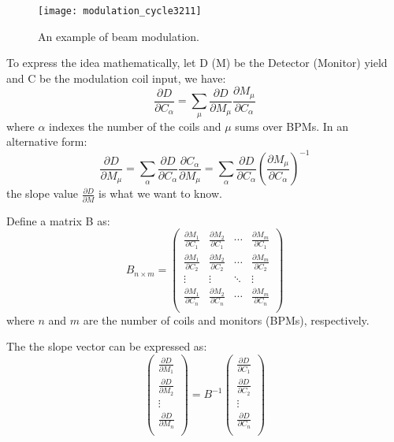 \begin{figure}
    \centering
    \texttt{[image: modulation\_cycle3211]}
    \caption{An example of beam modulation.}
\end{figure}

To express the idea mathematically, let D (M) be the Detector (Monitor) yield and C be
the modulation coil input, we have:
\begin{equation}
    \frac{\partial D}{\partial C_\alpha} = \sum_\mu \frac{\partial D}{\partial M_\mu}\frac{\partial M_\mu}{\partial C_\alpha}
\end{equation}
where $\alpha$ indexes the number of the coils and $\mu$ sums over BPMs. In an alternative form:
\begin{equation}
    \frac{\partial D}{\partial M_\mu} = \sum_\alpha \frac{\partial D}{\partial C_\alpha}\frac{\partial C_\alpha}{\partial M_\mu} = \sum_\alpha \frac{\partial D}{\partial C_\alpha}\left(\frac{\partial M_\mu}{\partial C_\alpha}\right)^{-1}
\end{equation}
the slope value $\frac{\partial D}{\partial M}$ is what we want to know.

Define a matrix B as:
\begin{equation}
    B_{n \times m} = 
    \begin{pmatrix}
	\frac{\partial M_1}{\partial C_1}   & \frac{\partial M_2}{\partial C_1}	& \cdots  & \frac{\partial M_m}{\partial C_1}   \\
	\frac{\partial M_1}{\partial C_2}   & \frac{\partial M_2}{\partial C_2}	& \cdots  & \frac{\partial M_m}{\partial C_2}   \\
	\vdots	& \vdots    & \ddots	& \vdots    \\
	\frac{\partial M_1}{\partial C_n}   & \frac{\partial M_2}{\partial C_n}	& \cdots  & \frac{\partial M_m}{\partial C_n}   \\
    \end{pmatrix}
    \label{eq:B_definition}
\end{equation}
where $n$ and $m$ are the number of coils and monitors (BPMs), respectively.

The the slope vector can be expressed as:
\begin{equation}
    \begin{pmatrix}
	\frac{\partial D}{\partial M_1}	\\
	\frac{\partial D}{\partial M_2}	\\
	\vdots	\\
	\frac{\partial D}{\partial M_n}	\\
    \end{pmatrix}
    =
    B^{-1}
    \begin{pmatrix}
	\frac{\partial D}{\partial C_1}	\\
	\frac{\partial D}{\partial C_2}	\\
	\vdots	\\
	\frac{\partial D}{\partial C_n}	\\
    \end{pmatrix}
\end{equation}

